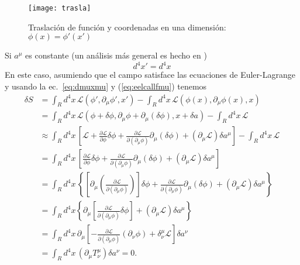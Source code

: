 \begin{figure} %
  \centering %
  \texttt{[image: trasla]} %
  \caption{Traslaci\'on de funci\'on y coordenadas en una dimensi\'on: $\phi(x)=\phi'(x')$ } %
  \label{fig:trasla} %
\end{figure} %
Si $a^\mu$ es constante (un an\'alisis m\'as general es hecho en \cite{r})
\begin{equation}
  d^4x'=d^4x
\end{equation}
En este caso, asumiendo que el campo satisface las ecuaciones de
Euler-Lagrange y usando la ec.~\eqref{eq:dmuxmu} y (\ref{eq:eelcallfmu}) tenemos
\begin{align}
  \delta S&=\int_{R}d^4x\,\mathcal{L}(\phi',\partial_\mu\phi',x')-\int_{R}d^4x\,\mathcal{L}(\phi(x),\partial_\mu\phi(x),x)\nonumber\\
  &=\int_{R}d^4x\,\mathcal{L}(\phi+\delta\phi,\partial_\mu\phi+\partial_\mu(\delta\phi),x+\delta a)-\int_{R}d^4x\,\mathcal{L}\nonumber\\
  &\approx\int_{R}d^4x\,
  \left[\mathcal{L}+
    \frac{\partial\mathcal{L}}{\partial\phi}\delta\phi+\frac{\partial\mathcal{L}}{\partial(\partial_\mu\phi)}\partial_\mu(\delta\phi)+
    (\partial_\mu\mathcal{L})\delta a^\mu\right]-\int_{R}d^4x\,\mathcal{L}\nonumber\\
  &=\int_{R}d^4x\,
  \left[
    \frac{\partial\mathcal{L}}{\partial\phi}\delta\phi+\frac{\partial\mathcal{L}}{\partial(\partial_\mu\phi)}\partial_\mu(\delta\phi)+
    (\partial_\mu\mathcal{L})\delta a^\mu\right]\nonumber\\
  &=\int_{R}d^4x\,
  \left\{ 
    \left[\partial_\mu\left(\frac{\partial\mathcal{L}}{\partial(\partial_\mu\phi)}
    \right)\right]\delta\phi+\frac{\partial\mathcal{L}}{\partial(\partial_\mu\phi)}\partial_\mu(\delta\phi)+
    (\partial_\mu\mathcal{L})\delta a^\mu\right\}\nonumber\\
  &=\int_{R}d^4x\left\{ 
    \partial_\mu\left[\frac{\partial\mathcal{L}}{\partial(\partial_\mu\phi)}\delta\phi\right]
  +(\partial_\mu\mathcal{L})\delta a^\mu\right\}\nonumber\\
  &=\int_{R}d^4x\,
    \partial_\mu\left[
      -\frac{\partial\mathcal{L}}{\partial(\partial_\mu\phi)}(\partial_\nu\phi)
      +\delta^\mu_\nu\mathcal{L}
    \right]\delta a^\nu\nonumber\\
    \label{eq:2}
  &=\int_{R}d^4x\,
  \left(
    \partial_\mu T^\mu_\nu
  \right)\delta a^\nu=0.
\end{align}
